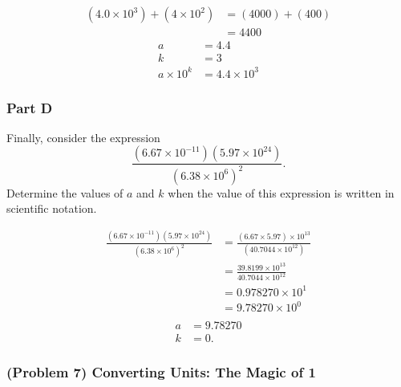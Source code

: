 \vspace{1em}

\begin{solution}
	\begin{align*}
		\left( 4.0 \times 10^{3} \right) + \left( 4 \times 10^2 \right) &=
		\left( 4000 \right) + \left( 400 \right) \\
		&= 4400
	\end{align*}
	\begin{align*}
		a &= 4.4 \\
		k &= 3 \\
		a \times 10^{k} &= 4.4 \times 10^{3}
	\end{align*}
\end{solution}

\subsubsection{Part D}

Finally, consider the expression
\[
	\frac{\left( 6.67 \times 10^{-11} \right)\left( 5.97 \times 10^{24} \right)}{\left( 6.38 \times 10^{6} \right)^2}
	.\]
Determine the values of $a$ and $k$ when the value of this expression is written in scientific notation.

\vspace{1em}

\begin{solution}
	\begin{align*}
		\frac{\left( 6.67 \times 10^{-11} \right)\left( 5.97 \times 10^{24} \right)}{\left( 6.38 \times 10^{6} \right)^2} &=
		\frac{\left( 6.67 \times 5.97 \right) \times 10^{13}}{\left( 40.7044 \times 10^{12} \right)} \\
		&= \frac{39.8199 \times 10^{13}}{40.7044 \times 10^{12}} \\
		&= 0.978270 \times 10^{1} \\
		&= 9.78270 \times 10^{0} \\
	\end{align*}
	\begin{align*}
		a &= 9.78270 \\
		k &= 0
		.\end{align*}
\end{solution}

\newpage

\subsubsection{(Problem 7) Converting Units: The Magic of 1}

